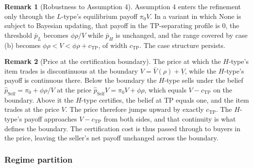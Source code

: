 \documentclass[11pt,letterpaper]{article}
\theoremstyle{definition}
\newtheorem{remark}{Remark}[section]
\begin{document}
\begin{remark}[Robustness to Assumption 4]\label{rem:assumption3}
Assumption 4 enters the refinement only through the $L$-type's equilibrium payoff $\pi_0 V$. In a variant in which None is subject to Bayesian updating, that payoff in the TP-separating profile is $0$, the threshold $\bar{p}_L$ becomes $\phi\rho/V$ while $\bar{p}_H$ is unchanged, and the range covered by case (b) becomes $\phi\rho < V < \phi\rho + c_{\text{TP}}$, of width $c_{\text{TP}}$. The case structure persists.
\end{remark}

\begin{remark}[Price at the certification boundary]\label{rem:pricejump}
The price at which the $H$-type's item trades is discontinuous at the boundary $V = \bar{V}(\rho) + \underline{V}$, while the $H$-type's payoff is continuous there. Below the boundary the $H$-type sells under the belief $\hat{p}_{\text{Self}} = \pi_0 + \phi\rho/V$ at the price $\hat{p}_{\text{Self}} V = \pi_0 V + \phi\rho$, which equals $V - c_{\text{TP}}$ on the boundary. Above it the $H$-type certifies, the belief at TP equals one, and the item trades at the price $V$. The price therefore jumps upward by exactly $c_{\text{TP}}$. The $H$-type's payoff approaches $V - c_{\text{TP}}$ from both sides, and that continuity is what defines the boundary. The certification cost is thus passed through to buyers in the price, leaving the seller's net payoff unchanged across the boundary.
\end{remark}

\subsubsection*{Regime partition}
\end{document}
